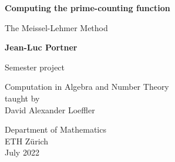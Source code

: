\begin{titlepage}
   \begin{center}
       \vspace*{4cm}

       \textbf{Computing the prime-counting function}
	   
	   \vspace{0.5cm}
	   The Meissel-Lehmer Method

       \vspace{0.5cm}
            
       \vspace{1.5cm}

       \textbf{Jean-Luc Portner}

	   \vspace{0.8cm}
            
       Semester project
       
       \vspace{0.5cm}
       
       Computation in Algebra and Number Theory\\
	   taught by\\
	   David Alexander Loeffler
            
       \vfill
     
       Department of Mathematics\\
       ETH Zürich\\
       July 2022
            
   \end{center}
\end{titlepage}

